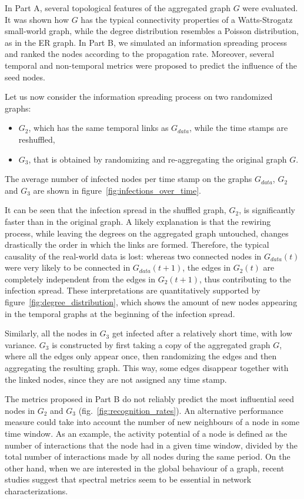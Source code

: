 \documentclass[letterpaper]{article}
\begin{document}
In Part A, several topological features of the aggregated graph \(G\) were evaluated. 
It was shown how \(G\) has the typical connectivity properties of a Watts-Strogatz small-world graph, while the degree distribution resembles a Poisson distribution, as in the ER graph. 
In Part B, we simulated an information spreading process and ranked the nodes according to the propagation rate. Moreover, several temporal and non-temporal metrics were proposed to predict the influence of the seed nodes.

\bigskip
\noindent Let us now consider the information spreading process on two randomized graphs:
\begin{itemize}
\item \(G_2\), which has the same temporal links as \(G_{data}\), while the time stamps are reshuffled,
\item \(G_3\), that is obtained by randomizing and re-aggregating the original graph \(G\).
\end{itemize}

\noindent The average number of infected nodes per time stamp on the graphs \(G_{data}\), \(G_2\) and \(G_3\) are shown in figure~\ref{fig:infections_over_time}.

It can be seen that the infection spread in the shuffled graph, \(G_2\), is significantly faster than in the original graph. A likely explanation is that the rewiring process, while leaving the degrees on the aggregated graph untouched, changes drastically the order in which the links are formed. Therefore, the typical causality of the real-world data is lost: whereas two connected nodes in \(G_{data}(t)\) were very likely to be connected in \(G_{data}(t+1)\), the edges in \(G_2(t)\) are completely independent from the edges in \(G_2(t+1)\), thus contributing to the infection spread.
These interpretations are quantitatively supported by figure~\ref{fig:degree_distribution}, which shows the amount of new nodes appearing in the temporal graphs at the beginning of the infection spread. 

Similarly, all the nodes in \(G_3\) get infected after a relatively short time, with low variance.
\(G_3\) is constructed by first taking a copy of the aggregated graph \(G\), where all the edges only appear once, then randomizing the edges and then aggregating the resulting graph. This way, some edges disappear together with the linked nodes, since they are not assigned any time stamp.

\bigskip
\noindent The metrics proposed in Part B do not reliably predict the most influential seed nodes in \(G_2\) and \(G_3\) (fig.~\ref{fig:recognition_rates}). An alternative performance measure could take into account the number of new neighbours of a node in some time window. As an example, the activity potential of a node is defined as the number of interactions that the node had in a given time window, divided by the total number of interactions made by all nodes during the same period.
On the other hand, when we are interested in the global behaviour of a graph, recent studies suggest that spectral metrics seem to be essential in network characterizations. 
\end{document}
